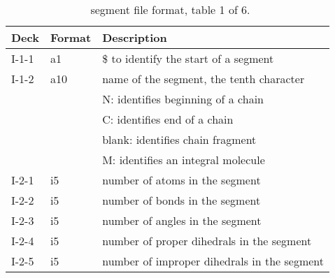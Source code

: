 \begin{table}[htbp]
\begin{center}
\begin{tabular*}{150mm}{p{15mm}p{12mm}l}
\hline\hline
Deck  & Format & Description \\ \hline
I-1-1 & a1     & \$ to identify the start of a segment \\ %
I-1-2 & a10    & name of the segment, the tenth character\\
      &        & N: identifies beginning of a chain\\
      &        & C: identifies end of a chain\\
      &        & blank: identifies chain fragment\\
      &        & M: identifies an integral molecule\\
I-2-1 & i5     & number of atoms in the segment\\
I-2-2 & i5     & number of bonds in the segment\\
I-2-3 & i5     & number of angles in the segment\\
I-2-4 & i5     & number of proper dihedrals in the segment\\
I-2-5 & i5     & number of improper dihedrals in the segment\\
\hline
\end{tabular*}
\caption{\nwargos\ segment file format, table 1 of 6.\label{tbl:nwaseg1}}
\end{center}
\end{table}

